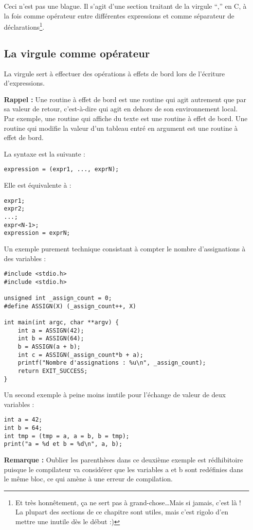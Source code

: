 \documentclass[../../../main.tex]{subfiles}
\begin{document}
Ceci n’est pas une blague. Il s’agit d’une section traitant de la virgule ``,'' en C, à la fois comme
opérateur entre différentes expressions et comme séparateur de déclarations\footnote{Et très honnêtement, ça ne sert pas à grand-chose\dots Mais si jamais, c’est là ! La plupart des sections de ce chapitre sont utiles, mais c'est rigolo d'en mettre une inutile dès le début :)}.
\subsection{La virgule comme opérateur}
\label{sub:la_virgule_comme_op_rateur}
La virgule sert à effectuer des opérations à effets de bord lors de l’écriture d’expressions.

\textbf{Rappel :} Une routine à effet de bord est une routine qui agit autrement que par sa valeur de retour,
c’est-à-dire qui agit en dehors de son environnement local. Par exemple, une routine qui affiche du
texte est une routine à effet de bord. Une routine qui modifie la valeur d’un tableau entré en argument
est une routine à effet de bord.

La syntaxe est la suivante :
\begin{verbatim}
expression = (expr1, ..., exprN);
\end{verbatim}
Elle est équivalente à :
\begin{verbatim}
expr1;
expr2;
...;
expr<N-1>;
expression = exprN;
\end{verbatim}
Un exemple purement technique consistant à compter le nombre d’assignations à des variables :
\begin{verbatim}
#include <stdio.h>
#include <stdio.h>

unsigned int _assign_count = 0;
#define ASSIGN(X) (_assign_count++, X)

int main(int argc, char **argv) {
	int a = ASSIGN(42);
	int b = ASSIGN(64);
	b = ASSIGN(a + b);
	int c = ASSIGN(_assign_count*b + a);
	printf("Nombre d'assignations : %u\n", _assign_count);
	return EXIT_SUCCESS;
}
\end{verbatim}
Un second exemple à peine moins inutile pour l’échange de valeur de deux variables :
\begin{verbatim}
int a = 42;
int b = 64;
int tmp = (tmp = a, a = b, b = tmp);
print("a = %d et b = %d\n", a, b);
\end{verbatim}
\textbf{Remarque :} Oublier les parenthèses dans ce deuxième exemple est rédhibitoire puisque le compilateur
va considérer que les variables a et b sont redéfinies dans le même bloc, ce qui amène à une erreur de
compilation.
\end{document}

